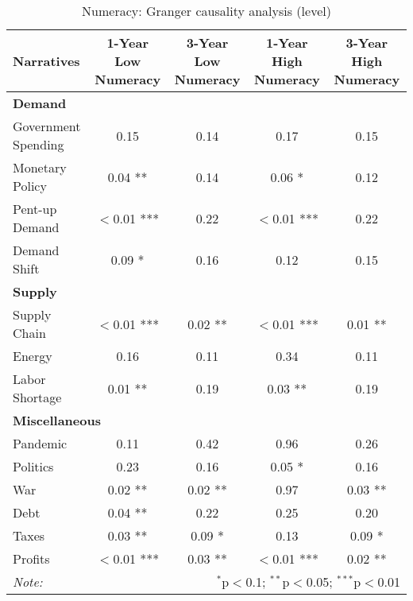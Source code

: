 \begin{sidewaystable}[ht]
\centering
\caption{Numeracy: Granger causality analysis (level)}\label{table:granger}

\begin{tabular}{lcccc}
\toprule
\textbf{Narratives} & \textbf{1-Year Low Numeracy} & \textbf{3-Year Low Numeracy} & \textbf{1-Year High Numeracy} & \textbf{3-Year High Numeracy} \\
\midrule
\multicolumn{5}{l}{\textbf{Demand}} \\
\midrule
Government Spending & 0.15 & 0.14 & 0.17 & 0.15 \\
Monetary Policy & 0.04 ** & 0.14 & 0.06 * & 0.12 \\
Pent-up Demand & $<$0.01 *** & 0.22 & $<$0.01 *** & 0.22 \\
Demand Shift & 0.09 * & 0.16 & 0.12 & 0.15 \\
\midrule
\multicolumn{5}{l}{\textbf{Supply}} \\
\midrule
Supply Chain & $<$0.01 *** & 0.02 ** & $<$0.01 *** & 0.01 ** \\
Energy & 0.16 & 0.11 & 0.34 & 0.11 \\
Labor Shortage & 0.01 ** & 0.19 & 0.03 ** & 0.19 \\
\midrule
\multicolumn{5}{l}{\textbf{Miscellaneous}} \\
\midrule
Pandemic & 0.11 & 0.42 & 0.96 & 0.26 \\
Politics & 0.23 & 0.16 & 0.05 * & 0.16 \\
War & 0.02 ** & 0.02 ** & 0.97 & 0.03 ** \\
Debt & 0.04 ** & 0.22 & 0.25 & 0.20 \\
Taxes & 0.03 ** & 0.09 * & 0.13 & 0.09 * \\
Profits & $<$0.01 *** & 0.03 ** & $<$0.01 *** & 0.02 ** \\
\midrule
\bottomrule
\textit{Note:}  & \multicolumn{4}{r}{$^{*}$p$<$0.1; $^{**}$p$<$0.05; $^{***}$p$<$0.01} \\
\bottomrule
\end{tabular}
\end{sidewaystable}

